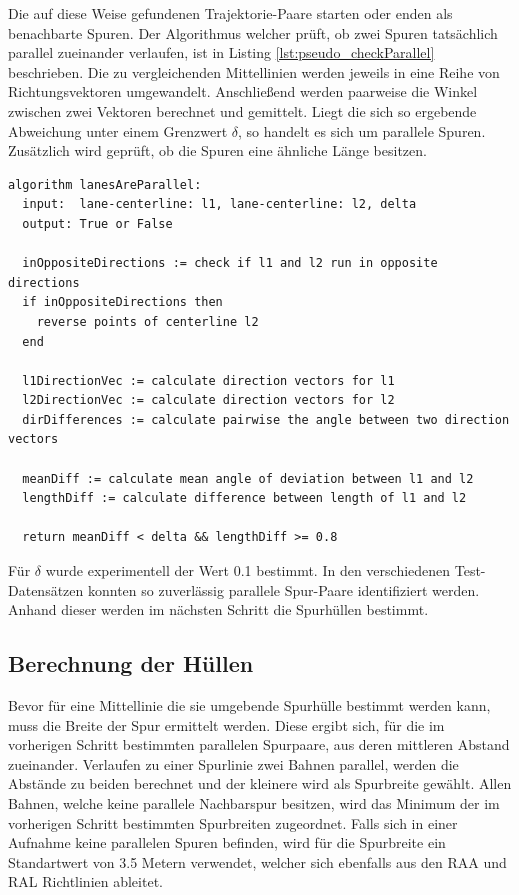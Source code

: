 Die auf diese Weise gefundenen Trajektorie-Paare starten oder enden als benachbarte Spuren.
Der Algorithmus welcher prüft, ob zwei Spuren tatsächlich parallel zueinander verlaufen, ist in Listing
\ref{lst:pseudo_checkParallel} beschrieben. Die zu vergleichenden Mittellinien werden jeweils in eine
Reihe von Richtungsvektoren umgewandelt. Anschließend werden paarweise die Winkel zwischen zwei Vektoren
berechnet und gemittelt.
Liegt die sich so ergebende Abweichung unter einem Grenzwert $\delta$, so handelt es sich um parallele Spuren.
Zusätzlich wird geprüft, ob die Spuren eine ähnliche Länge besitzen.
\begin{lstlisting}[caption=Pseudocode Überprüfung der Parallelität zweier Mittellinien, language=Pseudo, label=lst:pseudo_checkParallel]
algorithm lanesAreParallel:
  input:  lane-centerline: l1, lane-centerline: l2, delta
  output: True or False

  inOppositeDirections := check if l1 and l2 run in opposite directions
  if inOppositeDirections then
    reverse points of centerline l2
  end

  l1DirectionVec := calculate direction vectors for l1
  l2DirectionVec := calculate direction vectors for l2
  dirDifferences := calculate pairwise the angle between two direction vectors

  meanDiff := calculate mean angle of deviation between l1 and l2
  lengthDiff := calculate difference between length of l1 and l2

  return meanDiff < delta && lengthDiff >= 0.8
\end{lstlisting}

Für $\delta$ wurde experimentell der Wert 0.1 bestimmt. In den verschiedenen Test-Datensätzen konnten
so zuverlässig parallele Spur-Paare identifiziert werden. Anhand dieser werden im nächsten Schritt
die Spurhüllen bestimmt.

\subsection*{Berechnung der Hüllen}


Bevor für eine Mittellinie die sie umgebende Spurhülle bestimmt werden kann, muss die Breite der Spur
ermittelt werden. Diese ergibt sich, für die im vorherigen Schritt bestimmten parallelen Spurpaare, aus
deren mittleren Abstand zueinander. Verlaufen zu einer Spurlinie zwei Bahnen parallel, werden
die Abstände zu beiden berechnet und der kleinere wird als Spurbreite gewählt.
Allen Bahnen, welche keine parallele Nachbarspur besitzen, wird das Minimum der im vorherigen Schritt bestimmten
Spurbreiten zugeordnet.
Falls sich in einer Aufnahme keine parallelen Spuren befinden, wird für die Spurbreite ein Standartwert
von 3.5 Metern verwendet, welcher sich ebenfalls aus den RAA und RAL Richtlinien ableitet.

